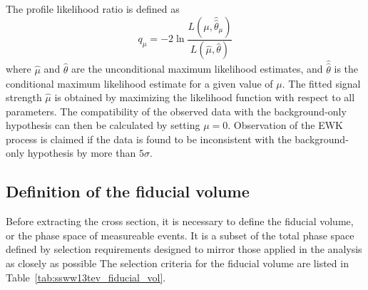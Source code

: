 The profile likelihood ratio is defined as
\begin{equation}
  q_{\mu} = -2\ln\frac{L(\mu,\hat{\hat{\theta}}_{\mu})}{L(\hat{\mu},\hat{\theta})}
  \label{dq:ssww13tev_xsec_test_statistic}
\end{equation}
where $\hat{\mu}$ and $\hat{\theta}$ are the unconditional maximum likelihood estimates, and $\hat{\hat{\theta}}$ is the conditional maximum likelihood estimate for a given value of $\mu$.
The fitted signal strength $\hat{\mu}$ is obtained by maximizing the likelihood function with respect to all parameters.
The compatibility of the observed data with the background-only hypothesis can then be calculated by setting $\mu=0$.
Observation of the \ssww EWK process is claimed if the data is found to be inconsistent with the background-only hypothesis by more than $5\sigma$.


\subsection{Definition of the fiducial volume}\label{ssww13tev:xsec_fid_vol}
Before extracting the cross section, it is necessary to define the fiducial volume, or the phase space of measureable events.
It is a subset of the total phase space defined by selection requirements designed to mirror those applied in the analysis as closely as possible
The selection criteria for the fiducial volume are listed in Table~\ref{tab:ssww13tev_fiducial_vol}.

